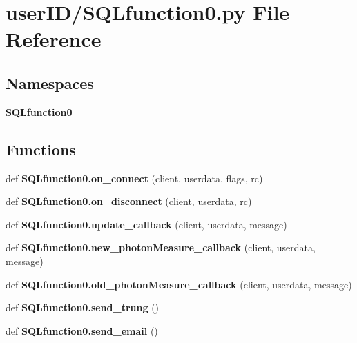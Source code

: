 \section{user\+I\+D/\+S\+Q\+Lfunction0.py File Reference}
\label{_s_q_lfunction0_8py}
\subsection*{Namespaces}
\begin{DoxyCompactItemize}
\item 
 \textbf{ S\+Q\+Lfunction0}
\end{DoxyCompactItemize}
\subsection*{Functions}
\begin{DoxyCompactItemize}
\item 
def \textbf{ S\+Q\+Lfunction0.\+on\+\_\+connect} (client, userdata, flags, rc)
\item 
def \textbf{ S\+Q\+Lfunction0.\+on\+\_\+disconnect} (client, userdata, rc)
\item 
def \textbf{ S\+Q\+Lfunction0.\+update\+\_\+callback} (client, userdata, message)
\item 
def \textbf{ S\+Q\+Lfunction0.\+new\+\_\+photon\+Measure\+\_\+callback} (client, userdata, message)
\item 
def \textbf{ S\+Q\+Lfunction0.\+old\+\_\+photon\+Measure\+\_\+callback} (client, userdata, message)
\item 
def \textbf{ S\+Q\+Lfunction0.\+send\+\_\+trung} ()
\item 
def \textbf{ S\+Q\+Lfunction0.\+send\+\_\+email} ()
\end{DoxyCompactItemize}
